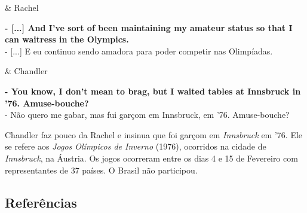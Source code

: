 \begin{tcolorbox}[enhanced,center upper,
    drop fuzzy shadow southeast, boxrule=0.3pt,
    lower separated=false, breakable,
    colframe=black!30!dialogoBorder,colback=white]
\begin{minipage}[c]{0.16\linewidth}
   & \centering \scriptsize{Rachel}
\end{minipage}
\hfill
\begin{minipage}[c]{0.8\linewidth}
  \textbf{- [...] And I've sort of been maintaining my amateur status so that I can waitress in the Olympics.}\\
  - [...] E eu continuo sendo amadora para poder competir nas Olimpíadas.
\end{minipage}

\medskip
\begin{minipage}[c]{0.16\linewidth}
   & \centering \scriptsize{Chandler}
\end{minipage}
\hfill
\begin{minipage}[c]{0.8\linewidth}
  \textbf{- You know, I don't mean to brag, but I waited tables at Innsbruck in '76. Amuse-bouche?}\\
  - Não quero me gabar, mas fui garçom em Innsbruck, em '76. Amuse-bouche?
\end{minipage}
\end{tcolorbox}

Chandler faz pouco da Rachel e insinua que foi garçom em
\emph{Innsbruck} em '76. Ele se refere aos \emph{Jogos Olímpicos de
Inverno} (1976), ocorridos na cidade de \emph{Innsbruck}, na Áustria. Os
jogos ocorreram entre os dias 4 e 15 de Fevereiro com representantes de
37 países. O Brasil não participou.

\hypertarget{referuxeancias-3}{%
\subsection{Referências}\label{referuxeancias-3}}

